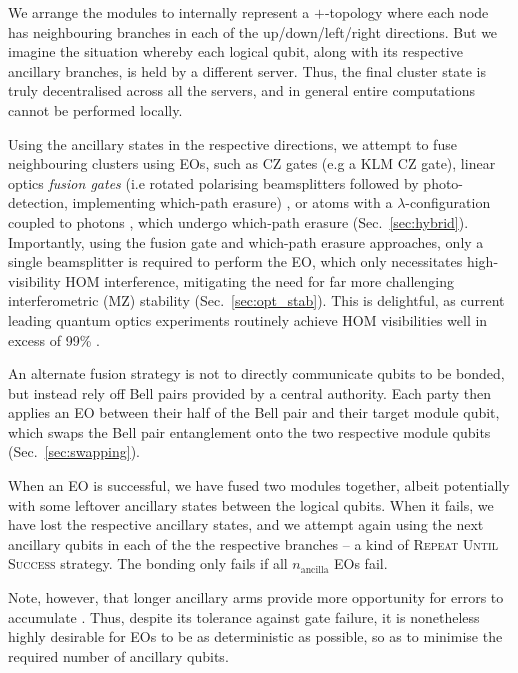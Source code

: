 We arrange the modules to internally represent a $+$-topology where each node has neighbouring branches in each of the up/down/left/right directions. But we imagine the situation whereby each logical qubit, along with its respective ancillary branches, is held by a different server. Thus, the final cluster state is truly decentralised across all the servers, and in general entire computations cannot be performed locally.

Using the ancillary states in the respective directions, we attempt to fuse neighbouring clusters using EOs, such as CZ gates (e.g a KLM CZ gate), linear optics \textit{fusion gates} (i.e rotated polarising beamsplitters followed by photo-detection, implementing which-path erasure) \cite{bib:BrowneRudolph05}, or atoms with a $\lambda$-configuration coupled to photons \cite{bib:BarrettKok05}, which undergo which-path erasure (Sec.~\ref{sec:hybrid}). Importantly, using the fusion gate and which-path erasure approaches, only a single beamsplitter is required to perform the EO, which only necessitates high-visibility HOM interference, mitigating the need for far more challenging interferometric (MZ) stability (Sec.~\ref{sec:opt_stab}). This is delightful, as current leading quantum optics experiments routinely achieve HOM visibilities well in excess of 99\% \cite{???}.

An alternate fusion strategy is not to directly communicate qubits to be bonded, but instead rely off Bell pairs provided by a central authority. Each party then applies an EO between their half of the Bell pair and their target module qubit, which swaps the Bell pair entanglement onto the two respective module qubits (Sec.~\ref{sec:swapping}).

When an EO is successful, we have fused two modules together, albeit potentially with some leftover ancillary states between the logical qubits. When it fails, we have lost the respective ancillary states, and we attempt again using the next ancillary qubits in each of the the respective branches -- a kind of \textsc{Repeat Until Success} strategy. The bonding only fails if all $n_\mathrm{ancilla}$ EOs fail.

Note, however, that longer ancillary arms provide more opportunity for errors to accumulate \cite{bib:RohdeRalphMunro07}. Thus, despite its tolerance against gate failure, it is nonetheless highly desirable for EOs to be as deterministic as possible, so as to minimise the required number of ancillary qubits.

